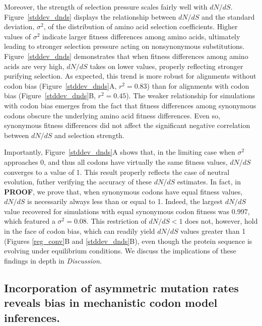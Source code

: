 \documentclass{pnastwo}
\begin{document}
\begin{article}
Moreover, the strength of selection pressure scales fairly well with $dN/dS$. Figure~\ref{stddev_dnds} displays the relationship between $dN/dS$ and the standard deviation, $\sigma^2$, of the distribution of amino acid selection coefficients. Higher values of $\sigma^2$ indicate larger fitness differences among amino acids, ultimately leading to stronger selection pressure acting on nonsynonymous substitutions. Figure~\ref{stddev_dnds} demonstrates that when fitness differences among amino acids are very high, $dN/dS$ takes on lower values, properly reflecting stronger purifying selection. As expected, this trend is more robust for alignments without codon bias (Figure~\ref{stddev_dnds}A, $r^2 = 0.83$) than for alignments with codon bias (Figure~\ref{stddev_dnds}B, $r^2 = 0.45$). The weaker relationship for simulations with codon bias emerges from the fact that fitness differences among synonymous codons obscure the underlying amino acid fitness differences. Even so, synonymous fitness differences did not affect the significant negative correlation between $dN/dS$ and selection strength.

Importantly, Figure~\ref{stddev_dnds}A shows that, in the limiting case when $\sigma^2$ approaches 0, and thus all codons have virtually the same fitness values, $dN/dS$ converges to a value of 1. This result properly reflects the case of neutral evolution, futher verifying the accuracy of these $dN/dS$ estimates. In fact, in \textbf{PROOF}, we prove that, when synonymous codons have equal fitness values, $dN/dS$ is necessarily always less than or equal to 1. Indeed, the largest $dN/dS$ value recovered for simulations with equal synonymous codon fitness was 0.997, which featured a $\sigma^2 = 0.08$. This restriction of $dN/dS < 1$ does not, however, hold in the face of codon bias, which can readily yield $dN/dS$ values greater than 1 (Figures \ref{reg_conv}B and \ref{stddev_dnds}B), even though the protein sequence is evolving under equilibrium conditions. We discuss the implications of these findings in depth in \textit{Discussion}.


\subsection*{Incorporation of asymmetric mutation rates reveals bias in mechanistic codon model inferences.}


\end{article}
\end{document}

